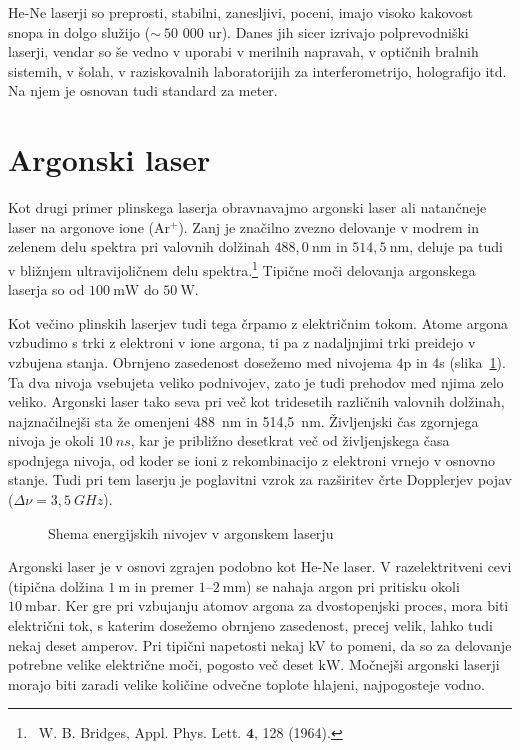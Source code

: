 He-Ne laserji so preprosti, stabilni, zanesljivi, poceni, imajo visoko kakovost
snopa in dolgo služijo ($\sim~50\,\,000$ ur).
Danes jih sicer izrivajo polprevodniški laserji, vendar so še vedno v uporabi
v merilnih napravah, v optičnih bralnih sistemih, v šolah, v raziskovalnih 
laboratorijih za interferometrijo, holografijo itd. Na njem je osnovan tudi 
standard za meter.

\section{Argonski laser}
Kot drugi primer plinskega laserja obravnavajmo argonski laser ali natančneje 
laser na argonove ione (Ar$^+$). Zanj je značilno zvezno 
delovanje v modrem in zelenem delu spektra pri 
valovnih dolžinah $488,0~\si{\nano\metre}$ in $514,5~\si{\nano\metre}$, deluje 
pa tudi v bližnjem ultravijoličnem delu spektra.\footnote{~W. B. Bridges,
Appl. Phys. Lett. $\mathbf{4}$, 128 (1964).} Tipične moči delovanja argonskega laserja
so od $100~\si{\milli\watt}$ do $50~\si{\watt}$.

Kot večino plinskih laserjev tudi tega črpamo z električnim tokom.
Atome argona vzbudimo s trki z elektroni v ione argona, ti pa z nadaljnjimi
trki preidejo v vzbujena stanja. Obrnjeno zasedenost
dosežemo med nivojema $4$p in $4$s (slika~\ref{fig:ArE}). 
Ta dva nivoja vsebujeta veliko podnivojev, zato je tudi prehodov med
njima zelo veliko. Argonski laser tako seva pri več kot tridesetih različnih
valovnih dolžinah, najznačilnejši sta že omenjeni 488~nm in 514,5~nm. 
Življenjski čas zgornjega nivoja je okoli $10~\si{ns}$, kar je približno 
desetkrat več od življenjskega časa spodnjega nivoja, od koder se ioni
z rekombinacijo z elektroni vrnejo v osnovno stanje. Tudi pri tem laserju
je poglavitni vzrok za razširitev črte Dopplerjev 
pojav ($\Delta \nu = 3,5~\si{GHz}$).

\begin{figure}[ht]
\centering
\def\svgwidth{80truemm} 

\caption{Shema energijskih nivojev v argonskem laserju}
\label{fig:ArE}
\end{figure}

Argonski laser je v osnovi zgrajen podobno kot He-Ne laser. 
V razelektritveni cevi
(tipična dolžina $1~\si{\metre}$ in premer $1$--$2~\si{\milli\metre}$)
se nahaja argon pri pritisku okoli $10~\si{\milli\bar}$. 
Ker gre pri vzbujanju atomov argona za dvostopenjski proces, mora biti električni tok, 
s katerim dosežemo obrnjeno zasedenost, precej velik, lahko tudi nekaj deset amperov. 
Pri tipični napetosti nekaj kV to pomeni, 
da so za delovanje potrebne velike električne moči, 
pogosto več deset $\si{\kilo\watt}$. Močnejši argonski laserji morajo biti
zaradi velike količine odvečne toplote hlajeni, najpogosteje vodno.


